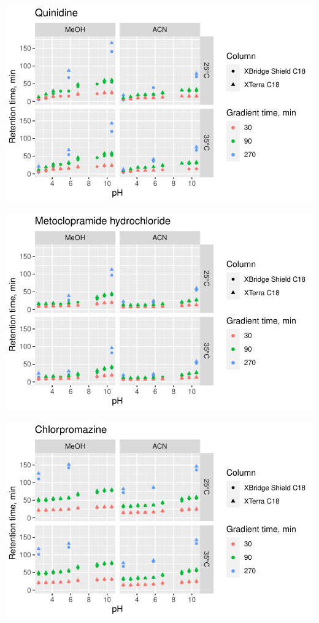 \documentclass[
  letterpaper,
  DIV=11,
  numbers=noendperiod]{scrreprt}
\begin{document}
\includegraphics{index_files/figure-pdf/unnamed-chunk-4-30.pdf}

\includegraphics{index_files/figure-pdf/unnamed-chunk-4-31.pdf}

\includegraphics{index_files/figure-pdf/unnamed-chunk-4-32.pdf}
\end{document}
